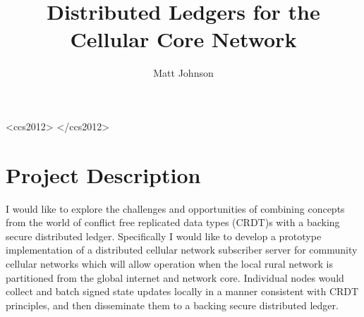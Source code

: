 \documentclass[sigconf]{acmart}
\newcommand{\matt}[1]{\textcolor{teal}{#1 -m9j} \\}
\begin{document}
\title{Distributed Ledgers for the Cellular Core Network}


\author{Matt Johnson}





%
%
\begin{CCSXML}
<ccs2012>
</ccs2012>
\end{CCSXML}



\maketitle



\section{Project Description}

I would like to explore the challenges and opportunities of combining
concepts from the world of conflict free replicated data types (CRDT)s
with a backing secure distributed ledger. Specifically I would like to
develop a prototype implementation of a distributed cellular network
subscriber server for community cellular networks which will allow
operation when the local rural network is partitioned from the global
internet and network core. Individual nodes would collect and batch
signed state updates locally in a manner consistent with CRDT
principles, and then disseminate them to a backing secure distributed
ledger.
\end{document}
